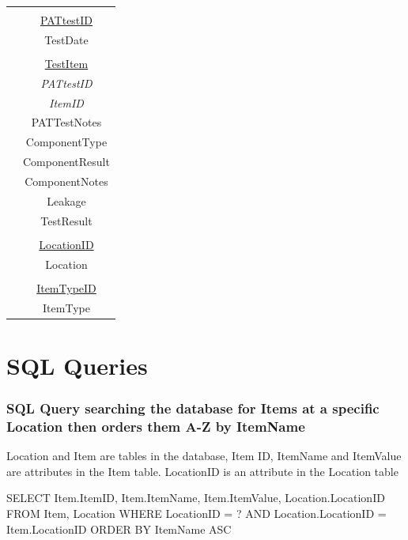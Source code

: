 \begin{center}
\begin{tabular}{|c|c|}
                                   &				                \\
                                   & \underline{PATtestID}         \\
                                   & TestDate                      \\   
                                   &				                \\
                                   & \underline{TestItem}          \\
                                   & \emph{PATtestID}              \\
                                   & \emph{ItemID}	                \\
                                   & PATTestNotes                  \\
                                   & ComponentType                 \\
                                   & ComponentResult               \\
                                   & ComponentNotes                \\
                                   & Leakage                       \\ 
                                   & TestResult                    \\ 
                                   &                               \\
                                   & \underline{LocationID}        \\
                                   & Location                      \\
                                   &                               \\
                                   & \underline{ItemTypeID}        \\
                                   & ItemType                      \\ \hline                                
    \end{tabular}
\end{center}

\section{SQL Queries}


\subsubsection{SQL Query searching the database for Items at a specific Location then orders them A-Z by ItemName}
Location and Item are tables in the database, Item ID, ItemName and ItemValue are attributes in the Item table. LocationID is an attribute in the Location table
\begin{sql}
    SELECT 
    Item.ItemID,
    Item.ItemName,
    Item.ItemValue,
    Location.LocationID
    FROM Item, Location
    WHERE LocationID = ? AND
    Location.LocationID = Item.LocationID
    ORDER BY ItemName ASC
\end{sql}

